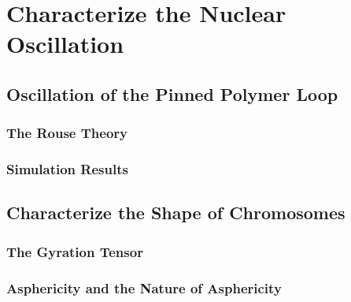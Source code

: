 \chapter{Characterize the Nuclear Oscillation}

\ifpdf
    \graphicspath{{Chapter6/Figs/Raster/}{Chapter6/Figs/PDF/}{Chapter6/Figs/}}
\else
    \graphicspath{{Chapter6/Figs/Vector/}{Chapter6/Figs/}}
\fi

\section{Oscillation of the Pinned Polymer Loop}
\label{sec:oscillation_of_the_pinned_polymer_loop}

\subsection{The Rouse Theory}
\label{sub:the_rouse_theory}

\subsection{Simulation Results}
\label{sub:simulation_results}




\section{Characterize the Shape of Chromosomes}
\label{sec:characterize_the_shape_of_chromosomes}

\subsection{The Gyration Tensor}
\label{sub:the_gyration_tensor}

\subsection{Asphericity and the Nature of Asphericity}
\label{sub:asphericity_and_the_nature_of_asphericity}




